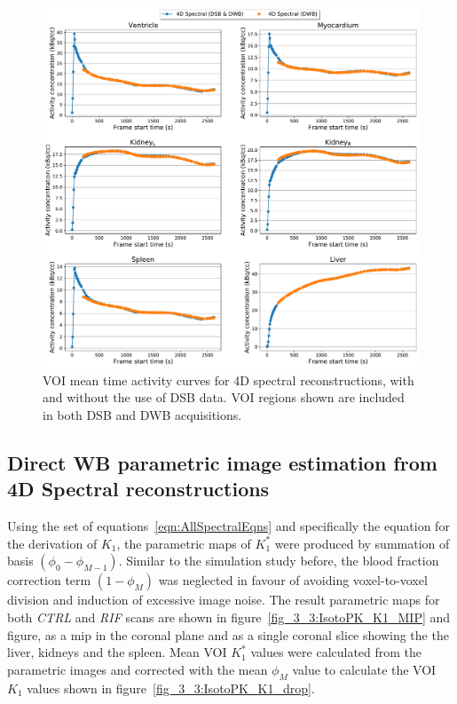 \begin{figure} [h!]
\centering
\includegraphics[scale=0.5,angle=0]{3_Results/3_3_DWB_Reconstruction/figures/3_3_IsotoPK_CTRL_DWB_4D_vs_4D_central.pdf}
\caption{VOI mean time activity curves for 4D spectral reconstructions, with and without the use of DSB data. VOI regions shown are included in both DSB and DWB acquisitions.}
\label{fig_3_3:IsotoPK_CTRL_DWB_4D_vs_3D_Peripheral}
\end{figure} 

\subsection{Direct WB parametric image estimation from 4D Spectral reconstructions}
Using the set of equations~\ref{eqn:AllSpectralEqns} and specifically the equation for the derivation of $K_1$, the parametric maps of $K_1^{*}$ were produced by summation of basis $(\phi_0-\phi_{M-1})$. Similar to the simulation study before, the blood fraction correction term $(1-\phi_M)$ was neglected in favour of avoiding voxel-to-voxel division and induction of excessive image noise. The result parametric maps for both \textit{CTRL} and \textit{RIF} scans are shown in figure~\ref{fig_3_3:IsotoPK_K1_MIP} and figure, as a \gls{mip} in the coronal plane and as a single coronal slice showing the the liver, kidneys and the spleen.
Mean VOI $K_1^{*}$ values were calculated from the parametric images and corrected with the mean $\phi_M$ value to calculate the VOI $K_1$ values shown in figure~\ref{fig_3_3:IsotoPK_K1_drop}. 

